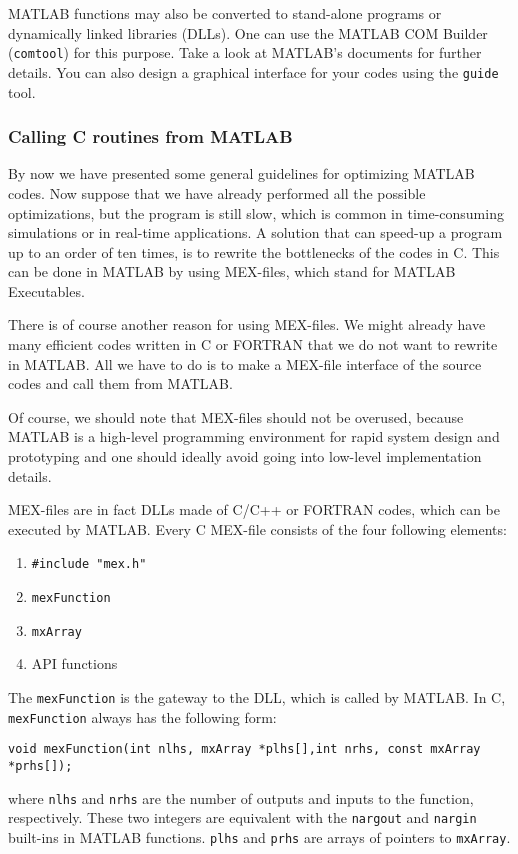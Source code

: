 \documentclass[10pt,a4paper]{article}
\begin{document}
MATLAB functions may also be converted to stand-alone programs or dynamically linked libraries (DLLs). One can use the MATLAB COM Builder (\texttt{comtool}) for this purpose. Take a look at MATLAB's documents for further details. You can also design a graphical interface for your codes using the \texttt{guide} tool.
\subsubsection{Calling C routines from MATLAB}
By now we have presented some general guidelines for optimizing MATLAB codes. Now suppose that we have already performed all the possible optimizations, but the program is still slow, which is common in time-consuming simulations or in real-time applications. A solution that can speed-up a program up to an order of ten times, is to rewrite the bottlenecks of the codes in C. This can be done in MATLAB by using MEX-files, which stand for MATLAB Executables.

There is of course another reason for using MEX-files. We might already have many efficient codes written in C or FORTRAN that we do not want to rewrite in MATLAB. All we have to do is to make a MEX-file interface of the source codes and call them from MATLAB.

Of course, we should note that MEX-files should not be overused, because MATLAB is a high-level programming environment for rapid system design and prototyping and one should ideally avoid going into low-level implementation details.

MEX-files are in fact DLLs made of C/C++ or FORTRAN codes, which can be executed by MATLAB. Every C MEX-file consists of the four following elements:
\begin{enumerate}
\item \texttt{\#include "mex.h"}
\item \texttt{mexFunction}
\item \texttt{mxArray}
\item API functions
\end{enumerate}
The \texttt{mexFunction} is the gateway to the DLL, which is called by MATLAB. In C, \texttt{mexFunction} always has the following form:
\begin{lstlisting}
void mexFunction(int nlhs, mxArray *plhs[],int nrhs, const mxArray *prhs[]);
\end{lstlisting}
where \texttt{nlhs} and \texttt{nrhs} are the number of outputs and inputs to the function, respectively. These two integers are equivalent with the \texttt{nargout} and \texttt{nargin} built-ins in MATLAB functions. \texttt{plhs} and \texttt{prhs} are arrays of pointers to \texttt{mxArray}.
\end{document}
